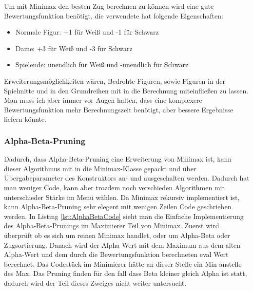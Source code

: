 \documentclass[12pt,a4paper,bibliography=totocnumbered,listof=totocnumbered]{article}
\begin{document}
Um mit Minimax den besten Zug berechnen zu können wird eine gute Bewertungsfunktion 
benötigt, die verwendete hat folgende Eigenschaften:
\begin{itemize}
    \item Normale Figur: +1 für Weiß und -1 für Schwarz
    \item Dame: +3 für Weiß und -3 für Schwarz
    \item Spielende: unendlich für Weiß und -unendlich für Schwarz
\end{itemize} 
Erweiterungsmöglichkeiten wären, Bedrohte Figuren, sowie Figuren in der Spielmitte und in den Grundreihen mit in die Berechnung miteinfließen zu lassen.
Man muss ich aber immer vor Augen halten, dass eine komplexere Bewertungsfunktion mehr Berechnungszeit benötigt, aber bessere Ergebnisse liefern könnte.

\subsubsection{Alpha-Beta-Pruning}
Dadurch, dass Alpha-Beta-Pruning eine Erweiterung von Minimax ist, kann dieser Algorithmus mit in die Minimax-Klasse gepackt
und über Übergabeparameter des Konstruktors an- und ausgeschalten werden. Dadurch hat man weniger Code, kann aber trozdem noch 
verschieden Algorithmen mit unterschieder Stärke im Menü wählen. Da Minimax rekursiv implementiert ist, kann Alpha-Beta-Pruning sehr elegent mit wenigen 
Zeilen Code geschrieben werden. In Listing \ref{lst:AlphaBetaCode} sieht man die Einfache Implementierung des Alpha-Beta-Prunings im Maximierer Teil 
von Minimax. Zuerst wird überprüft ob es sich um reinen Minimax handlet, oder um Alpha-Beta oder Zugsortierung. Danach wird der Alpha Wert mit dem
Maximum aus dem alten Alpha-Wert und dem durch die Bewertungsfunktion berechneten eval Wert berechnet. Das Codestück im Minimierer hätte an dieser Stelle 
ein Min anstelle des Max. Das Pruning finden für den fall dass Beta kleiner gleich Alpha ist statt, dadurch wird der Teil dieses Zweiges nicht weiter untersucht.
\vspace{1em}

\end{document}
